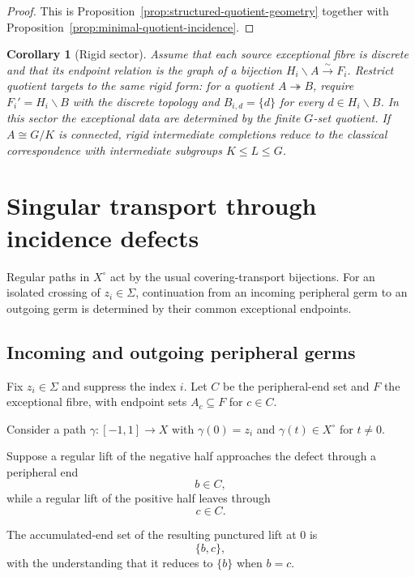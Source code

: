\documentclass[11pt]{article}
\theoremstyle{plain}
\newtheorem{corollary}[theorem]{Corollary}
\theoremstyle{definition}
\begin{document}
\begin{proof}
This is Proposition~\ref{prop:structured-quotient-geometry} together with
Proposition~\ref{prop:minimal-quotient-incidence}.
\end{proof}

\begin{corollary}[Rigid sector]
Assume that each source exceptional fibre is discrete and that its endpoint relation is
the graph of a bijection $H_i\backslash A\xrightarrow{\sim}F_i$.  Restrict quotient
targets to the same rigid form: for a quotient $A\twoheadrightarrow B$, require
$F_i'=H_i\backslash B$ with the discrete topology and $B_{i,d}=\{d\}$ for every
$d\in H_i\backslash B$.  In this sector the exceptional data are determined by the
finite $G$-set quotient.  If $A\cong G/K$ is connected, rigid intermediate completions
reduce to the classical correspondence with intermediate subgroups $K\leq L\leq G$.
\end{corollary}



\section{Singular transport through incidence defects}
\label{sec:local-singular-transport}

Regular paths in $X^\circ$ act by the usual covering-transport bijections.
For an isolated crossing of $z_i\in\Sigma$, continuation from an incoming
peripheral germ to an outgoing germ is determined by their common
exceptional endpoints.


\subsection{Incoming and outgoing peripheral germs}
\label{subsec:incoming-outgoing-germs}

Fix $z_i\in\Sigma$ and suppress the index $i$.  Let $C$ be the peripheral-end
set and $F$ the exceptional fibre, with endpoint sets $A_c\subseteq F$ for $c\in C$.

Consider a path $\gamma:[-1,1]\to X$ with $\gamma(0)=z_i$ and
$\gamma(t)\in X^\circ$ for $t\neq0$.

Suppose a regular lift of the negative half approaches the defect through
a peripheral end
\[
b\in C,
\]
while a regular lift of the positive half leaves through
\[
c\in C.
\]

The accumulated-end set of the resulting punctured lift at $0$ is
\[
\{b,c\},
\]
with the understanding that it reduces to $\{b\}$ when $b=c$.
\end{document}
